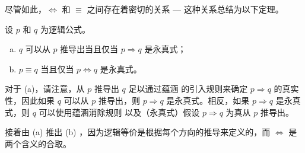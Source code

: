 尽管如此，$\Leftrightarrow$ 和 $\equiv$ 之间存在着密切的关系 --- 这种关系总结为以下定理。

\begin{theorem}
\label{thmTautologyAndDerivation}
设 $p$ 和 $q$ 为逻辑公式。
\begin{enumerate}[(a)]
\item $q$ 可以从 $p$ 推导出当且仅当 $p \Rightarrow q$ 是永真式；
\item $p \equiv q$ 当且仅当 $p \Leftrightarrow q$ 是永真式。
\end{enumerate}
\end{theorem}

\begin{cproof}
对于 (a)，请注意，从 $p$ 推导出 $q$ 足以通过蕴涵 \introrule{\Rightarrow} 的引入规则来确定 $p \Rightarrow q$ 的真实性，因此如果 $q$ 可以从 $p$ 推导出，则 $p \Rightarrow q$ 是永真式。相反，如果 $p \Rightarrow q$ 是永真式，则 $q$ 可以使用蕴涵消除规则 \elimrule{\Rightarrow} 以及（永真式）假设 $p \Rightarrow q$ 为真从 $p$ 推导出。

接着由 (a) 推出 (b) ，因为逻辑等价是根据每个方向的推导来定义的，而 $\Leftrightarrow$ 是两个含义的合取。
\end{cproof}


